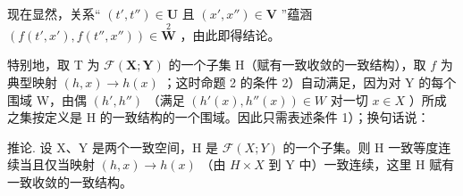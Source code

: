 现在显然，关系“ \((t', t'') \in \mathbf{U}\) 且 \((x', x'') \in \mathbf{V}\) ”蕴涵 \((f(t', x'), f(t'', x'')) \in \overset{2}{\mathbf{W}}\) ，由此即得结论。

特别地，取 T 为 \(\mathcal{F}(\mathbf{X};\mathbf{Y})\) 的一个子集 H（赋有一致收敛的一致结构），取 \(f\) 为典型映射 \((h,x)\to h(x)\) ；这时命题 2 的条件 2）自动满足，因为对 Y 的每个围域 W，由偶 \((h',h'')\) （满足 \((h'(x),h''(x))\in W\) 对一切 \(x\in X\) ）所成之集按定义是 H 的一致结构的一个围域。因此只需表述条件 1）；换句话说：

推论. 设 X、Y 是两个一致空间，H 是 \(\mathcal{F}(X;Y)\) 的一个子集。则 H 一致等度连续当且仅当映射 \((h,x) \to h(x)\) （由 \(H \times X\) 到 Y 中）一致连续，这里 H 赋有一致收敛的一致结构。

